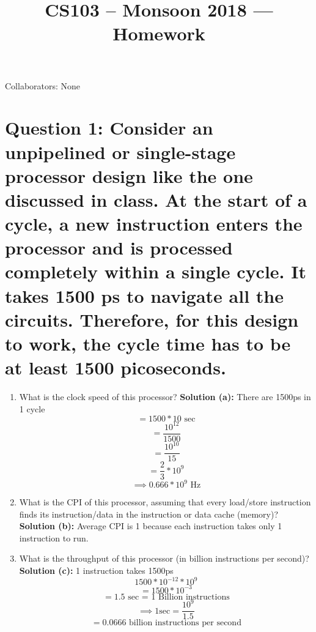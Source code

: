 \documentclass[11pt]{article}
\title{CS103 -- Monsoon 2018 --- Homework \Homework}
\author{\Name 
}
\date{}
\newenvironment{qparts}{\begin{enumerate}[{(}a{)}]}{\end{enumerate}}
\begin{document}
\maketitle

Collaborators: None

\section*{Question 1: Consider an unpipelined or single-stage processor design like the one discussed in class. At the start of a cycle, a new instruction enters the processor and is processed completely within a single cycle. It takes 1500 ps to navigate all the circuits. Therefore, for this design to work, the cycle time has to be at least 1500 picoseconds.}
\begin{qparts}
\item
What is the clock speed of this processor? 
\newline
\textbf{Solution (a): } There are 1500ps in 1 cycle
\[= 1500 * 10\text{ sec}\]
\[= \frac{10^{12}}{1500}\]
\[= \frac{10^{10}}{15}\]
\[= \frac{2}{3} * 10^{9}\]
\[\implies 0.666 * 10^{9}\text{ Hz}\]

\item What is the CPI of this processor, assuming that every load/store instruction finds its instruction/data in the instruction or data cache (memory)?
\newline
\textbf{Solution (b): } Average CPI is 1 because each instruction takes only 1 instruction to run.

\item What is the throughput of this processor (in billion instructions per second)?
\newline
\textbf{Solution (c):} 1 instruction takes 1500ps \\
\[1500 * 10^{-12} * 10 ^{9}\]
\[= 1500 * 10^{-3}\]
\[= 1.5\text{ sec = 1 Billion instructions}\]
\[\implies 1\text{sec} = \frac{10^{9}}{1.5}\]
\[= 0.0666 \text{ billion instructions per second}\]
\end{qparts}
\end{document}
